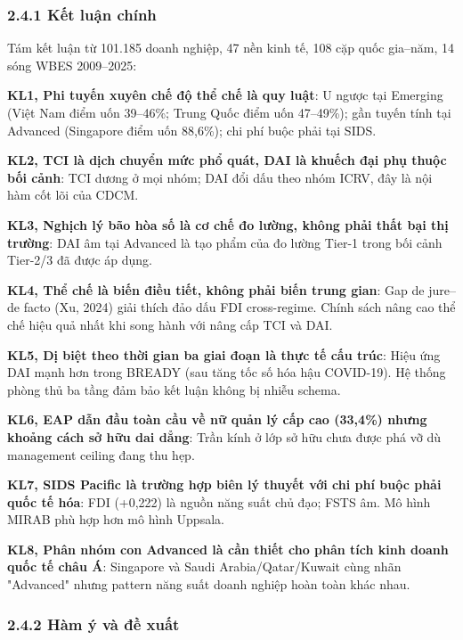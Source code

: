 \documentclass[12pt,a4paper]{article}
\begin{document}
\hypertarget{241-kux1ebft-luux1eadn-chuxednh}{%
\subsubsection{2.4.1 Kết luận
chính}\label{241-kux1ebft-luux1eadn-chuxednh}}

Tám kết luận từ 101.185 doanh nghiệp, 47 nền kinh tế, 108 cặp quốc
gia--năm, 14 sóng WBES 2009--2025:

\textbf{KL1, Phi tuyến xuyên chế độ thể chế là quy luật}: U ngược tại
Emerging (Việt Nam điểm uốn 39--46\%; Trung Quốc điểm uốn 47--49\%); gần
tuyến tính tại Advanced (Singapore điểm uốn 88,6\%); chi phí buộc phải
tại SIDS.

\textbf{KL2, TCI là dịch chuyển mức phổ quát, DAI là khuếch đại phụ
thuộc bối cảnh}: TCI dương ở mọi nhóm; DAI đổi dấu theo nhóm ICRV, đây
là nội hàm cốt lõi của CDCM.

\textbf{KL3, Nghịch lý bão hòa số là cơ chế đo lường, không phải thất
bại thị trường}: DAI âm tại Advanced là tạo phẩm của đo lường Tier-1
trong bối cảnh Tier-2/3 đã được áp dụng.

\textbf{KL4, Thể chế là biến điều tiết, không phải biến trung gian}: Gap
de jure--de facto (Xu, 2024) giải thích đảo dấu FDI cross-regime. Chính
sách nâng cao thể chế hiệu quả nhất khi song hành với nâng cấp TCI và
DAI.

\textbf{KL5, Dị biệt theo thời gian ba giai đoạn là thực tế cấu trúc}:
Hiệu ứng DAI mạnh hơn trong BREADY (sau tăng tốc số hóa hậu COVID-19).
Hệ thống phòng thủ ba tầng đảm bảo kết luận không bị nhiễu schema.

\textbf{KL6, EAP dẫn đầu toàn cầu về nữ quản lý cấp cao (33,4\%) nhưng
khoảng cách sở hữu dai dẳng}: Trần kính ở lớp sở hữu chưa được phá vỡ dù
management ceiling đang thu hẹp.

\textbf{KL7, SIDS Pacific là trường hợp biên lý thuyết với chi phí buộc
phải quốc tế hóa}: FDI (+0,222) là nguồn năng suất chủ đạo; FSTS âm. Mô
hình MIRAB phù hợp hơn mô hình Uppsala.

\textbf{KL8, Phân nhóm con Advanced là cần thiết cho phân tích kinh
doanh quốc tế châu Á}: Singapore và Saudi Arabia/Qatar/Kuwait cùng nhãn
"Advanced" nhưng pattern năng suất doanh nghiệp hoàn toàn khác nhau.

\hypertarget{242-huxe0m-uxfd-vuxe0-ux111ux1ec1-xuux1ea5t}{%
\subsubsection{2.4.2 Hàm ý và đề
xuất}\label{242-huxe0m-uxfd-vuxe0-ux111ux1ec1-xuux1ea5t}}
\end{document}
